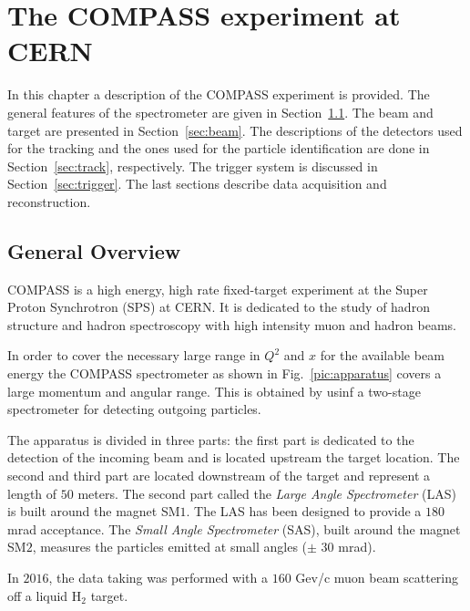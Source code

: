 
\chapter{The COMPASS experiment at CERN} %

\label{ch:exp} %

In this chapter a description of the COMPASS experiment is provided. The general features of the spectrometer are given in Section~\ref{sec:specgen}. The beam and target are presented in Section~\ref{sec:beam}. The descriptions of the detectors used for the tracking and the ones used for the particle identification are done in Section~\ref{sec:track}, respectively. The trigger system is discussed in Section~\ref{sec:trigger}. The last sections describe data acquisition and reconstruction.


\section{General Overview}\label{sec:specgen}

COMPASS is a high energy, high rate fixed-target experiment at the Super Proton Synchrotron (SPS) at CERN. It is dedicated to the study of hadron structure and hadron spectroscopy with high intensity muon and hadron beams.

In order to cover the necessary large range in $Q^2$ and $x$ for the available beam energy the COMPASS spectrometer as shown in Fig.~\ref{pic:apparatus} covers a large momentum and angular range. This is obtained by usinf a two-stage spectrometer for detecting outgoing particles.

The apparatus is divided in three parts: the first part is dedicated to the detection of the incoming beam and is located upstream the target location. The second and third part are located downstream of the target and represent a length of $50$ meters. The second part called the \textit{Large Angle Spectrometer} (LAS) is built around the magnet SM$1$. The LAS has been designed to provide a $180$ mrad acceptance. The \textit{Small Angle Spectrometer} (SAS), built around the magnet SM$2$, measures the particles emitted at small angles ($\pm$ $30$ mrad).

In $2016$, the data taking was performed with a $160$ Gev/c muon beam scattering off a liquid H$_2$ target.

